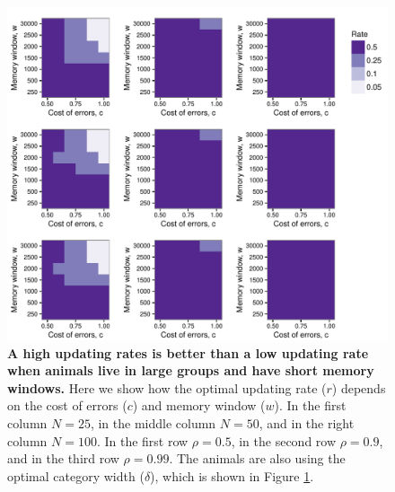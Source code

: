 \begin{figure}
\includegraphics[width=6.85in]{figures/l_heat_maps.pdf}
\caption{\sffamily\small\textbf{A high updating rates is better than a low updating rate when animals live in large groups and have short memory windows.} Here we show how the optimal updating rate ($r$) depends on the cost of errors ($c$) and memory window ($w$). In the first column $N=25$, in the middle column $N=50$, and in the right column $N=100$. In the first row $\rho=0.5$, in the second row $\rho=0.9$, and in the third row $\rho=0.99$. The animals are also using the optimal category width ($\delta$), which is shown in Figure \ref{l}.}
\label{l}
\end{figure} 

